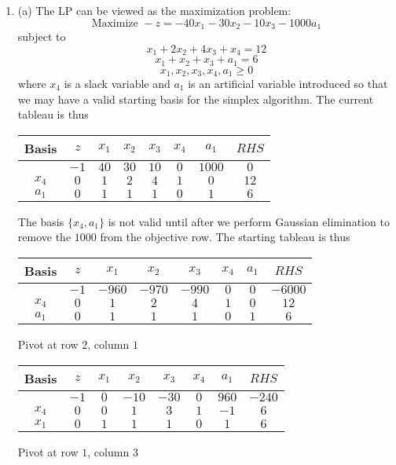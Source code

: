 \documentclass{article}[12pt,a4paper]
\begin{document}
\begin{enumerate}
  
  \pagebreak
  \item
  (a) The LP can be viewed as the maximization problem:
  $$\mbox{Maximize } -z = -40x_1 - 30x_2 - 10x_3 - 1000a_1$$
  subject to
  $$x_1 + 2x_2 + 4x_3 + x_4 = 12$$
  $$x_1 + x_2 + x_3 + a_1 = 6$$
  $$x_1, x_2, x_3, x_4, a_1 \ge 0$$
  where $x_4$ is a slack variable and $a_1$ is an artificial variable introduced so that we may have a valid starting basis for the 
  simplex algorithm. The current tableau is thus
   \begin{center}
  \begin{tabular}{c | c | c c c c c | c}
  Basis & $z$ & $x_1$ & $x_2$ & $x_3$ & $x_4$ & $a_1$ & $RHS$ \\ \hline
           & $-1$ & $40$ & $30$ & $10$ & $0$ & $1000$ & $0$ \\ \hline
  $x_4$ & $0$ & $1$ & $2$ & $4$ & $1$ & $0$ & $12$ \\
  $a_1$ & $0$ & $1$ & $1$ & $1$ & $0$ & $1$ & $6$
  \end{tabular}
  \end{center}
  The basis $\{x_4, a_1\}$ is not valid until after we perform Gaussian elimination to remove the $1000$ from the objective row.
  The starting tableau is thus
  \begin{center}
  \begin{tabular}{c | c | c c c c c | c}
  Basis & $z$ & $x_1$ & $x_2$ & $x_3$ & $x_4$ & $a_1$ & $RHS$ \\ \hline
           & $-1$ & $-960$ & $-970$ & $-990$ & $0$ & $0$ & $-6000$ \\ \hline
  $x_4$ & $0$ & $1$ & $2$ & $4$ & $1$ & $0$ & $12$ \\
  $a_1$ & $0$ & $1$ & $1$ & $1$ & $0$ & $1$ & $6$
  \end{tabular}
  \end{center}
  Pivot at row $2$, column $1$
   \begin{center}
  \begin{tabular}{c | c | c c c c c | c}
  Basis & $z$ & $x_1$ & $x_2$ & $x_3$ & $x_4$ & $a_1$ & $RHS$ \\ \hline
           & $-1$ & $0$ & $-10$ & $-30$ & $0$ & $960$ & $-240$ \\ \hline
  $x_4$ & $0$ & $0$ & $1$ & $3$ & $1$ & $-1$ & $6$ \\
  $x_1$ & $0$ & $1$ & $1$ & $1$ & $0$ & $1$ & $6$
  \end{tabular}
  \end{center}
  Pivot at row $1$, column $3$
   \begin{center}

\end{center}
\end{enumerate}
\end{document}
